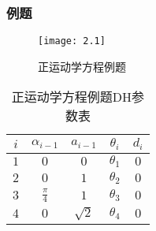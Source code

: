 \documentclass[
12pt, %
a4paper, 
oneside, %
headinclude,footinclude, %
]{scrartcl}
\begin{document}
\subsubsection[例题]{例题}
\noindent
\begin{minipage}{0.45\textwidth}
\begin{figure}[H]
\centering
\texttt{[image: 2.1]}
\caption{正运动学方程例题}
\end{figure}
\end{minipage}
\begin{minipage}{0.55\textwidth}
\begin{table}[H]
\centering
\begin{tabular}{c|cccc}
\hline
$ i $ & $ \alpha_{i - 1} $ & $ a_{i - 1} $ & $ \theta_i $ & $ d_i $ \\
\hline
$ 1 $ & $ 0 $ & $ 0 $ & $ \theta_1 $ & $ 0 $ \\
$ 2 $ & $ 0 $ & $ 1 $ & $ \theta_2 $ & $ 0 $ \\
$ 3 $ & $ \frac{\pi}{4} $ & $ 1 $ & $ \theta_3 $ & $ 0 $ \\
$ 4 $ & $ 0 $ & $ \sqrt{2} $ & $ \theta_4 $ & $ 0 $ \\
\hline
\end{tabular}
\caption{正运动学方程例题DH参数表}
\end{table}
\end{minipage}
\end{document}
